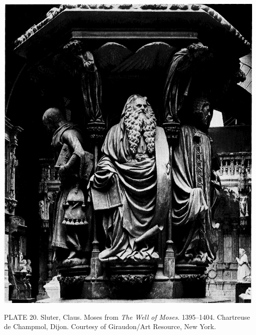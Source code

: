 \protect\hypertarget{20_ILLUSTRATIONS_FOLLOW_PAGE.xhtmlux5cux23id_19}{}{}\includegraphics{include/html/images/339_1.png}

PLATE 20. Sluter, Claus. Moses from \emph{The Well of Moses}.
1395--1404. Chartreuse de Champmol, Dijon. Courtesy of Giraudon/Art
Resource, New York.


